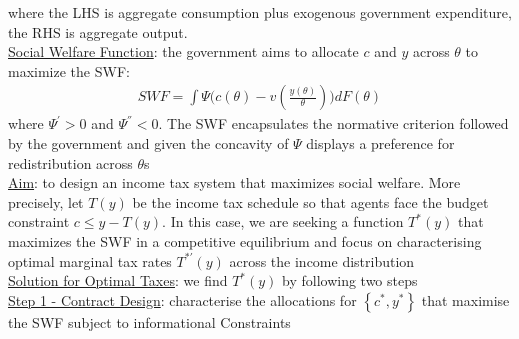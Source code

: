 \documentclass{article}
\begin{document}
where the LHS is aggregate consumption plus exogenous government expenditure, the RHS is aggregate output.
\\ \underline{Social Welfare Function}: the government aims to allocate $c$ and $y$ across $\theta$ to maximize the SWF:
\begin{gather*}
    SWF = \int \Psi \big( c (\theta) - v(\frac{y(\theta)}{\theta}) \big) d F(\theta)
\end{gather*}
where $\Psi^{'} > 0$ and $\Psi^{''} < 0$. The SWF encapsulates the normative criterion followed by the government and given the concavity of $\Psi$ displays a preference for redistribution across $\theta$s
\\ \underline{Aim}: to design an income tax system that maximizes social welfare. More precisely, let $T(y)$ be the income tax schedule so that agents face the budget constraint $c \leq y - T(y)$. In this case, we are seeking a function $T^{*}(y)$ that maximizes the SWF in a competitive equilibrium and focus on characterising optimal marginal tax rates $T^{*'}(y)$ across the income distribution
\\ \underline{Solution for Optimal Taxes}: we find $T^{*}(y)$ by following two steps
\\ \underline{Step 1 - Contract Design}: characterise the allocations for $\left\{ c^{*}, y^{*} \right\}$ that maximise the SWF subject to informational Constraints
\end{document}
